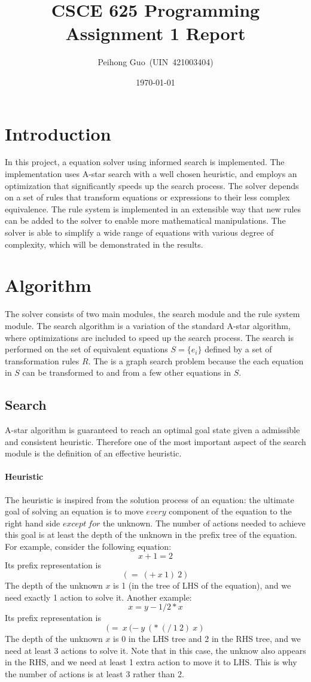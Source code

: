 \documentclass{article}
\title{CSCE 625 Programming Assignment 1 Report}
\author{Peihong Guo~(UIN~421003404)}
\date{\today}
\begin{document}
\maketitle

\section{Introduction}
In this project, a equation solver using informed search is implemented. The implementation uses A-star search with a well chosen heuristic, and employs an optimization that significantly speeds up the search process. The solver depends on a set of rules that transform equations or expressions to their less complex equivalence. The rule system is implemented in an extensible way that new rules can be added to the solver to enable more mathematical manipulations. The solver is able to simplify a wide range of equations with various degree of complexity, which will be demonstrated in the results.

\section{Algorithm}
The solver consists of two main modules, the search module and the rule system module. The search algorithm is a variation of the standard A-star algorithm, where optimizations are included to speed up the search process. The search is performed on the set of equivalent equations $S = \{e_i\}$ defined by a set of transformation rules $R$. The is a graph search problem because the each equation in $S$ can be transformed to and from a few other equations in $S$.

\subsection{Search}
A-star algorithm is guaranteed to reach an optimal goal state given a admissible and consistent heuristic. Therefore one of the most important aspect of the search module is the definition of an effective heuristic.

\paragraph{Heuristic} The heuristic is inspired from the solution process of an equation: the ultimate goal of solving an equation is to move $every$ component of the equation to the right hand side $except~for$ the unknown. The number of actions needed to achieve this goal is at least the depth of the unknown in the prefix tree of the equation. For example, consider the following equation:
\[ x + 1 = 2 \]
Its prefix representation is 
\[(=~(+~x~1)~2)\]
The depth of the unknown $x$ is 1 (in the tree of LHS of the equation), and we need exactly 1 action to solve it. Another example:
\[ x = y - 1/2*x \]
Its prefix representation is 
\[(=~x~(-~y~(*~(/~1~2)~x)\]
The depth of the unknown $x$ is 0 in the LHS tree and 2 in the RHS tree, and we need at least 3 actions to solve it. Note that in this case, the unknow also appears in the RHS, and we need at least 1 extra action to move it to LHS. This is why the number of actions is at least 3 rather than 2.
\end{document}
